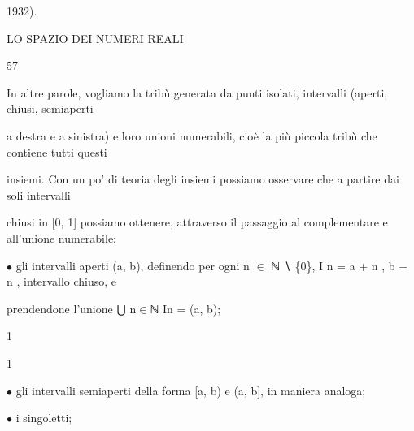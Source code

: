 \documentclass[a4paper,portrait,12pt]{article}
\begin{document}
1932).





\begin{flushleft}
 LO SPAZIO DEI NUMERI REALI
\end{flushleft}





57





\begin{flushleft}
In altre parole, vogliamo la tribù generata da punti isolati, intervalli (aperti, chiusi, semiaperti
\end{flushleft}


\begin{flushleft}
a destra e a sinistra) e loro unioni numerabili, cio\`{e} la più piccola tribù che contiene tutti questi
\end{flushleft}


\begin{flushleft}
insiemi. Con un po' di teoria degli insiemi possiamo osservare che a partire dai soli intervalli
\end{flushleft}


\begin{flushleft}
chiusi in [0, 1] possiamo ottenere, attraverso il passaggio al complementare e all'unione numerabile:
\end{flushleft}


\begin{flushleft}
$\bullet$ gli intervalli aperti (a, b), definendo per ogni n $\in$ ℕ ∖ \{0\}, I n = a + n , b $-$ n , intervallo chiuso, e
\end{flushleft}


\begin{flushleft}
prendendone l'unione ⋃ n$\in$ℕ In = (a, b);
\end{flushleft}


1





1





\begin{flushleft}
$\bullet$ gli intervalli semiaperti della forma [a, b) e (a, b], in maniera analoga;
\end{flushleft}


\begin{flushleft}
$\bullet$ i singoletti;
\end{flushleft}
\end{document}
